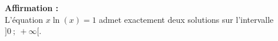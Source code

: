 \textbf{Affirmation :}\\
L'équation $x \ln (x) = 1$ admet exactement deux solutions sur l'intervalle $]0~;~ +\infty[$.
